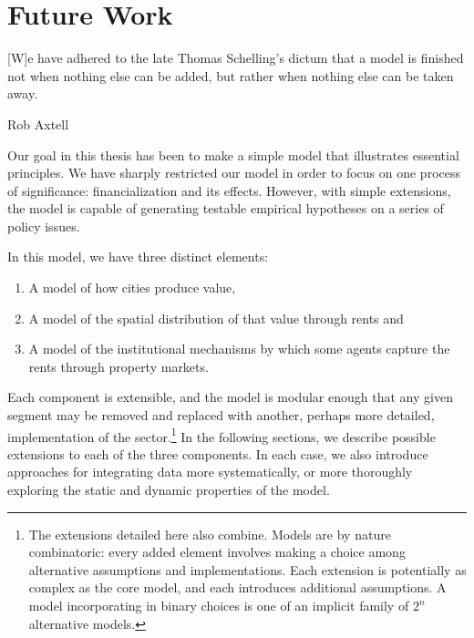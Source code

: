 \chapter[Future Work]{Future Work} \label{appendix-future-work}

\epigraph{[W]e have adhered to the late Thomas Schelling’s dictum that a model is finished not when nothing else can be added, but rather when nothing else can be taken away.}{Rob Axtell \cite{axtellDynamicsFirmsData2024}}


Our goal in this thesis has been to make a simple model that illustrates essential principles. %
We have sharply restricted our model in order to focus on one process of significance: financialization and its effects. However, with simple extensions, the model is capable of generating testable empirical hypotheses on a series of policy issues. 




In this model, we have three distinct elements: 
\begin{enumerate}
    \item A model of how cities produce value,
    \item A model of the spatial distribution of that value through rents and 
    \item A model of the institutional mechanisms by which some agents capture the rents through property markets. %
\end{enumerate}Each component is extensible, %
and the model is modular enough that any given segment may be removed and replaced with another, perhaps more detailed, implementation of the sector.\footnote{The extensions detailed here also combine. Models are by nature combinatoric: every added element involves making a choice among alternative assumptions and implementations. Each extension is potentially as complex as the core model, and each introduces additional assumptions. A model incorporating in binary choices is one of an implicit family of $2^n$ alternative models.} 
In the following sections, we describe possible extensions to each of the three components. %
In each case, we also introduce approaches for integrating data more systematically, or more thoroughly exploring the static and dynamic properties of the model. %


